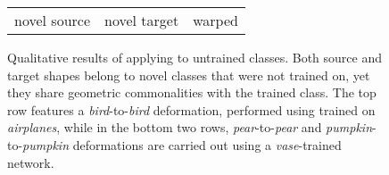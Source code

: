 \documentclass[acmtog,timestamp]{acmart}%
\newcommand{\jsubfig}[2]{%
	\sbox\jsavebox{#1}%
	\parbox[t]{\wd\jsavebox}{\centering\usebox\jsavebox\\#2}%
	}
\begin{document}
\begin{figure}[h]
\begin{tabular}{c c c}
novel source &
novel target &
warped \\

\end{tabular}



    
\caption{
Qualitative results of applying \ourmethod{} to untrained classes. 
Both source and target shapes belong to novel classes that were not trained on, yet they share geometric commonalities with the trained class.
The top row features a \emph{bird}-to-\emph{bird} deformation, performed using \ourmethod{} trained on \emph{airplanes}, while in the bottom two rows, \emph{pear}-to-\emph{pear} and \emph{pumpkin}-to-\emph{pumpkin} deformations are carried out using a \emph{vase}-trained network.}
\label{fig:novel_novel_class}
\end{figure}\begin{comment}
    \jsubfig{\texttt{[image: \{figures/novel\_novel\_class/bat1bat2/sample002\_source.png]}}}{}%
    \hfill \jsubfig{\texttt{[image: figures/novel\_novel\_class/bat1bat2/sample002\_target.png]}}{}%
    \hfill \jsubfig{\texttt{[image: figures/novel\_novel\_class/bat1bat2/sample002\_targetPred.png]}}{}%
    
    
    \jsubfig{\texttt{[image: figures/novel\_novel\_class/bird1bird3/sample001\_source.png]}}{}%
    \hfill \jsubfig{\texttt{[image: figures/novel\_novel\_class/bird1bird3/sample001\_target.png]}}{}%
    \hfill \jsubfig{\texttt{[image: figures/novel\_novel\_class/bird1bird3/sample001\_targetPred.png]}}{}%
    \\
	\jsubfig{\texttt{[image: \{figures/novel\_class/line.png]}}}{}%
	\\
    \jsubfig{\texttt{[image: figures/novel\_novel\_class/pear6pear7/sample002\_source.png]}}{}%
    \hfill \jsubfig{\texttt{[image: figures/novel\_novel\_class/pear6pear7/sample002\_target.png]}}{}%
    \hfill \jsubfig{\texttt{[image: figures/novel\_novel\_class/pear6pear7/sample002\_targetPred.png]}}{}%
    
    \jsubfig{\texttt{[image: figures/novel\_novel\_class/pumpkin1pumpkin3/sample001\_source.png]}}{}%
    \hfill \jsubfig{\texttt{[image: figures/novel\_novel\_class/pumpkin1pumpkin3/sample001\_target.png]}}{}%
    \hfill \jsubfig{\texttt{[image: figures/novel\_novel\_class/pumpkin1pumpkin3/sample001\_targetPred.png]}}{}%
\end{comment}\begin{comment}


\end{comment}
\end{document}
